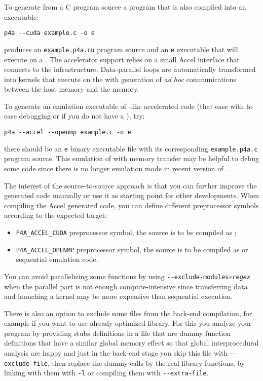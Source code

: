 \documentclass[a4paper]{article}
\begin{document}
To generate from a C program source a \Acuda program that is also compiled
into an executable:
\begin{verbatim}
p4a --cuda example.c -o e
\end{verbatim}
produces an \texttt{example.p4a.cu} \Acuda program source and an
\texttt{e} executable that will execute on a \Agpu. The \Agpu accelerator
support relies on a small \Apfa Accel interface that connects to the
\Acuda infrastructure. Data-parallel loops are automatically transformed
into \Acuda kernels that execute on the \Agpu with generation of \emph{ad
  hoc} communications between the host memory and the \Agpu memory.

To generate an \Aopenmp emulation executable of \Agpu-like accelerated
code (that ease with to ease debugging or if you do not have a \Agpu), try:
\begin{verbatim}
p4a --accel --openmp example.c -o e
\end{verbatim}
there should be an \texttt{e} binary executable file with its
corresponding \texttt{example.p4a.c} program source. This \Aopenmp
emulation of \Acuda with memory transfer may be helpful to debug some code
since there is no longer emulation mode in recent version of \Acuda.

The interest of the source-to-source approach is that you can further
improve the generated code manually or use it as starting point for other
developments. When compiling the \Apfa Accel generated code, you can
define different preprocessor symbols according to the expected target:
\begin{itemize}
\item \verb|P4A_ACCEL_CUDA| preprocessor symbol, the source is to be
  compiled as \Acuda;
\item \verb|P4A_ACCEL_OPENMP| preprocessor symbol, the source is to be
  compiled as \Aopenmp or sequential emulation code.
\end{itemize}

You can avoid parallelizing some functions by using
\texttt{-{}-exclude-modules=\emph{regex}} when the parallel part is not
enough compute-intensive since transferring data and launching a kernel
may be more expensive than sequential execution.

There is also an option to exclude some files from the back-end
compilation, for example if you want to use already optimized library. For
this you analyze your program by providing stubs definitions in a file
that are dummy function definitions that have a similar global memory
effect so that \Apips global interprocedural analysis are happy and just
in the back-end stage you skip this file with \verb|--exclude-file|, then
replace the dummy calls by the real library functions, by linking with
them with \texttt{-l} or compiling them with \verb|--extra-file|.
\end{document}
